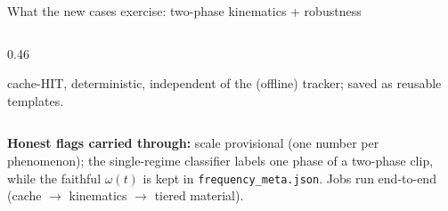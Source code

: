 \documentclass[aspectratio=169,10pt]{beamer}
\begin{document}
\begin{frame}{What the new cases exercise: two-phase kinematics + robustness}
\begin{columns}[T]
\begin{column}{0.46\textwidth}
\begin{itemize}
  cache-HIT, deterministic, independent of the (offline) tracker; saved as reusable templates.
\end{itemize}
\end{column}
\end{columns}
\vspace{0.4em}
\begin{tcolorbox}[colback=cGrey!8,colframe=cGrey,boxsep=1pt,left=4pt,right=4pt]
\tiny \textbf{Honest flags carried through:} scale provisional (one number per phenomenon); the
single-regime classifier labels one phase of a two-phase clip, while the faithful $\omega(t)$ is
kept in \texttt{frequency\_meta.json}. Jobs run end-to-end (cache $\to$ kinematics $\to$ tiered material).
\end{tcolorbox}
\end{frame}
\end{document}
